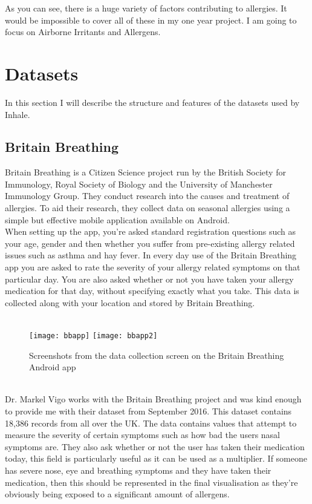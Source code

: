 As you can see, there is a huge variety of factors contributing to allergies. It would be impossible to cover all of these in my one year project. I am going to focus on Airborne Irritants and Allergens.


\section{Datasets}

In this section I will describe the structure and features of the datasets used by Inhale.\\

\subsection{Britain Breathing}

Britain Breathing is a Citizen Science project run by the British Society for Immunology, Royal Society of Biology and the University of Manchester Immunology Group. They conduct research into the causes and treatment of allergies. To aid their research, they collect data on seasonal allergies using a simple but effective mobile application available on Android.\\

When setting up the app, you're asked standard registration questions such as your age, gender and then whether you suffer from pre-existing allergy related issues such as asthma and hay fever. In every day use of the Britain Breathing app you are asked to rate the severity of your allergy related symptoms on that particular day. You are also asked whether or not you have taken your allergy medication for that day, without specifying exactly what you take. This data is collected along with your location and stored by Britain Breathing.

\begin{SCfigure}
\caption{Screenshots from the data collection screen on the Britain Breathing Android app}\\
\centering
\texttt{[image: bbapp]}
\centering
\texttt{[image: bbapp2]}
\end{SCfigure}\\

Dr. Markel Vigo works with the Britain Breathing project and was kind enough to provide me with their dataset from September 2016. This dataset contains 18,386 records from all over the UK. The data contains values that attempt to measure the severity of certain symptoms such as how bad the users nasal symptoms are. They also ask whether or not the user has taken their medication today, this field is particularly useful as it can be used as a multiplier. If someone has severe nose, eye and breathing symptoms and they have taken their medication, then this should be represented in the final visualisation as they're obviously being exposed to a significant amount of allergens.\\

